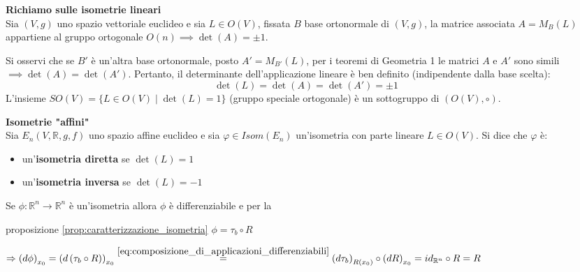         \begin{richiamo}
        \mbox{}
        
        \textbf{Richiamo sulle isometrie lineari}\\
        Sia $(V,g)$ uno spazio vettoriale euclideo e sia $L \in O(V)$, fissata $B$ base ortonormale di $(V,g)$, la matrice associata $A = M_B(L)$ appartiene al gruppo ortogonale $O(n) \implies \det(A) = \pm 1$.

        Si osservi che se $B'$ è un'altra base ortonormale, posto $A' = M_{B'}(L)$, per i teoremi di Geometria 1 le matrici $A$ e $A'$ sono simili $\implies \det(A) = \det(A')$.
        Pertanto, il determinante dell'applicazione lineare è ben definito (indipendente dalla base scelta): 
        \[
        \det(L) = \det(A) = \det(A') = \pm 1
        \]
        L'insieme $SO(V) = \{L \in O(V) \mid \det(L) = 1\}$ (gruppo speciale ortogonale) è un sottogruppo di $(O(V), \circ)$.

        \textbf{Isometrie "affini"}\\
        Sia $E_n(V, \mathbb{R}, g, f)$ uno spazio affine euclideo e sia $\varphi \in Isom(E_n)$ un'isometria con parte lineare $L \in O(V)$. 
        Si dice che $\varphi$ è:
        \begin{itemize}
            \item un'\textbf{isometria diretta} se $\det(L) = 1$
            \item un'\textbf{isometria inversa} se $\det(L) = -1$
        \end{itemize}
        \end{richiamo}
        \begin{osservazione}
        \label{oss:differenziale_di_una_isometria}
        Se $\phi: \mathbb{R}^n \to \mathbb{R}^n$ è un'isometria allora $\phi$ è differenziabile e per la
        
        proposizione \ref{prop:caratterizzazione_isometria} $\phi= \tau_b \circ R$ 
        
        $\Rightarrow \left(d\phi\right)_{x_0} = \left(d \left( \tau_b \circ R \right) \right)_{x_0} \overset{\eqref{eq:composizione_di_applicazioni_differenziabili}}{=} \left(d\tau_b\right)_{R(x_0)} \circ \left(dR\right)_{x_0} = id_{\mathbb{R}^n} \circ R = R$ 
        \end{osservazione}
        \newpage
